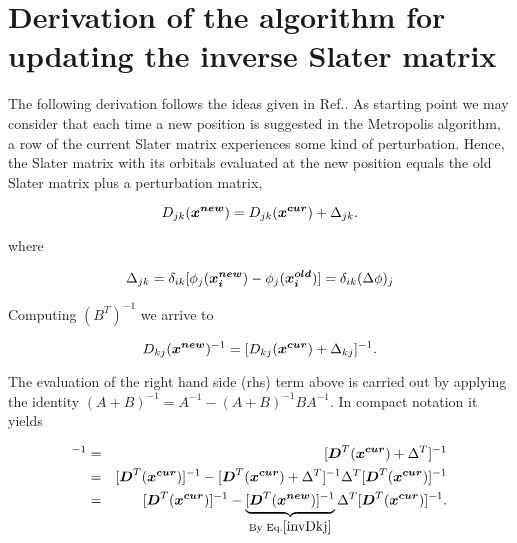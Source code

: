 \chapter{Derivation of the algorithm for updating the inverse Slater matrix}\label{updatingAlgorithmDer}  %

\renewcommand{\theequation}{A-\arabic{equation}}
  
 \setcounter{equation}{0}  %

The following derivation follows the ideas given in Ref.\cite{Williansom}. As starting point we may consider that each time a new position is suggested in the Metropolis algorithm, a row of the current Slater matrix experiences some kind of perturbation. Hence, the Slater matrix with its orbitals evaluated at the new position equals the old Slater matrix plus a perturbation matrix,

\begin{equation}\label{oldSM}
D_{jk}(\boldsymbol{x^{new}}) = D_{jk}(\boldsymbol{x^{cur}}) + \Delta_{jk}.
\end{equation}

where

\begin{equation}\label{pertMatrix}
\Delta_{jk} = \delta_{ik}[\phi_j(\boldsymbol{x_{i}^{new}}) - \phi_j(\boldsymbol{x_{i}^{old}})] = \delta_{ik}(\Delta\phi)_j 
\end{equation}

Computing $(B^T)^{-1}$ we arrive to

\begin{equation}\label{invDkj}
 D_{kj}(\boldsymbol{x^{new}})^{-1} = [D_{kj}(\boldsymbol{x^{cur}}) + \Delta_{kj}]^{-1}.
\end{equation}

The evaluation of the right hand side (rhs) term above is carried out by applying the identity $(A +  B)^{-1} = A^{-1} - (A + B)^{-1} B A^{-1}$. In compact notation it yields

\begin{eqnarray*}
 [\bfv{D}^{T}(\bfv{x^{new}})]^{-1} & = & [\bfv{D}^{T}(\bfv{x^{cur}}) + \Delta^T]^{-1}\\
& = & [\bfv{D}^{T}(\bfv{x^{cur}})]^{-1} - [\bfv{D}^{T}(\bfv{x^{cur}}) + \Delta^T]^{-1} \Delta^T [\bfv{D}^{T}(\bfv{x^{cur}})]^{-1}\\
& = & [\bfv{D}^{T}(\bfv{x^{cur}})]^{-1} - \underbrace{{[\bfv{D}^{T}(\bfv{x^{new}})]^{-1}}}_{\text{By Eq.}{\ref{invDkj}}}  \Delta^T [\bfv{D}^{T}(\bfv{x^{cur}})]^{-1}.
\end{eqnarray*}

